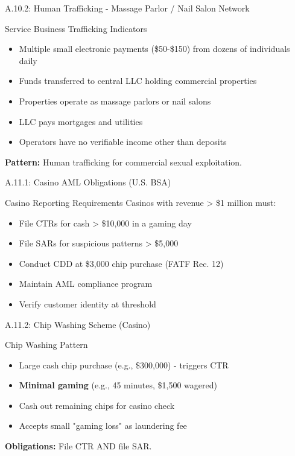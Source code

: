 \documentclass{beamer}
\begin{document}
	\begin{frame}{A.10.2: Human Trafficking - Massage Parlor / Nail Salon Network}
		\begin{block}{Service Business Trafficking Indicators}
			\begin{itemize}
				\item Multiple small electronic payments (\$50-\$150) from dozens of individuals daily
				\item Funds transferred to central LLC holding commercial properties
				\item Properties operate as massage parlors or nail salons
				\item LLC pays mortgages and utilities
				\item Operators have no verifiable income other than deposits
			\end{itemize}
		\end{block}
		\textbf{Pattern:} Human trafficking for commercial sexual exploitation.
	\end{frame}
	
	
	\begin{frame}{A.11.1: Casino AML Obligations (U.S. BSA)}
		\begin{block}{Casino Reporting Requirements}
			Casinos with revenue > \$1 million must:
			\begin{itemize}
				\item File CTRs for cash > \$10,000 in a gaming day
				\item File SARs for suspicious patterns > \$5,000
				\item Conduct CDD at \$3,000 chip purchase (FATF Rec. 12)
				\item Maintain AML compliance program
				\item Verify customer identity at threshold
			\end{itemize}
		\end{block}
	\end{frame}
	
	\begin{frame}{A.11.2: Chip Washing Scheme (Casino)}
		\begin{block}{Chip Washing Pattern}
			\begin{itemize}
				\item Large cash chip purchase (e.g., \$300,000) - triggers CTR
				\item \textbf{Minimal gaming} (e.g., 45 minutes, \$1,500 wagered)
				\item Cash out remaining chips for casino check
				\item Accepts small "gaming loss" as laundering fee
			\end{itemize}
		\end{block}
		\textbf{Obligations:} File CTR AND file SAR.
	\end{frame}
	
\end{document}
